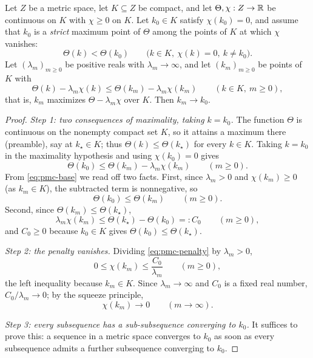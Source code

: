 \begin{lemma}
Let $Z$ be a metric space, let $K\subseteq Z$ be compact, and let
$\Theta,\chi:Z\to\mathbb{R}$ be continuous on $K$ with $\chi\ge0$ on $K$. Let $k_0\in K$
satisfy $\chi(k_0)=0$, and assume that $k_0$ is a \emph{strict} maximum point of
$\Theta$ among the points of $K$ at which $\chi$ vanishes:
\[
  \Theta(k)<\Theta(k_0)\qquad
  \bigl(k\in K,\ \chi(k)=0,\ k\ne k_0\bigr).
\]
Let $(\lambda_m)_{m\ge0}$ be positive reals with $\lambda_m\to\infty$, and let
$(k_m)_{m\ge0}$ be points of $K$ with
\[
  \Theta(k)-\lambda_m\chi(k)\le\Theta(k_m)-\lambda_m\chi(k_m)
  \qquad(k\in K,\ m\ge0),
\]
that is, $k_m$ maximizes $\Theta-\lambda_m\chi$ over $K$. Then $k_m\to k_0$.
\end{lemma}
\begin{proof}
\emph{Step 1: two consequences of maximality, taking $k=k_0$.}
The function $\Theta$ is continuous on the nonempty compact set $K$, so it
attains a maximum there (preamble), say at $k_\star\in K$; thus
$\Theta(k)\le\Theta(k_\star)$ for every $k\in K$. Taking $k=k_0$ in the
maximality hypothesis and using $\chi(k_0)=0$ gives
\begin{equation}\label{eq:pmc-base}
  \Theta(k_0)\le\Theta(k_m)-\lambda_m\chi(k_m)\qquad(m\ge0).
\end{equation}
From \eqref{eq:pmc-base} we read off two facts. First, since $\lambda_m>0$ and
$\chi(k_m)\ge0$ (as $k_m\in K$), the subtracted term is nonnegative, so
\begin{equation}\label{eq:pmc-value}
  \Theta(k_0)\le\Theta(k_m)\qquad(m\ge0).
\end{equation}
Second, since $\Theta(k_m)\le\Theta(k_\star)$,
\begin{equation}\label{eq:pmc-penalty}
  \lambda_m\chi(k_m)\le\Theta(k_\star)-\Theta(k_0)=:C_0\qquad(m\ge0),
\end{equation}
and $C_0\ge0$ because $k_0\in K$ gives $\Theta(k_0)\le\Theta(k_\star)$.

\emph{Step 2: the penalty vanishes.}
Dividing \eqref{eq:pmc-penalty} by $\lambda_m>0$,
\[
  0\le\chi(k_m)\le\frac{C_0}{\lambda_m}\qquad(m\ge0),
\]
the left inequality because $k_m\in K$. Since $\lambda_m\to\infty$ and $C_0$ is
a fixed real number, $C_0/\lambda_m\to0$; by the squeeze principle,
\begin{equation}\label{eq:pmc-chi}
  \chi(k_m)\longrightarrow0\qquad(m\to\infty).
\end{equation}

\emph{Step 3: every subsequence has a sub-subsequence converging to $k_0$.}
It suffices to prove this: a sequence in a metric space converges to $k_0$ as
soon as every subsequence admits a further subsequence converging to $k_0$.


\end{proof}
